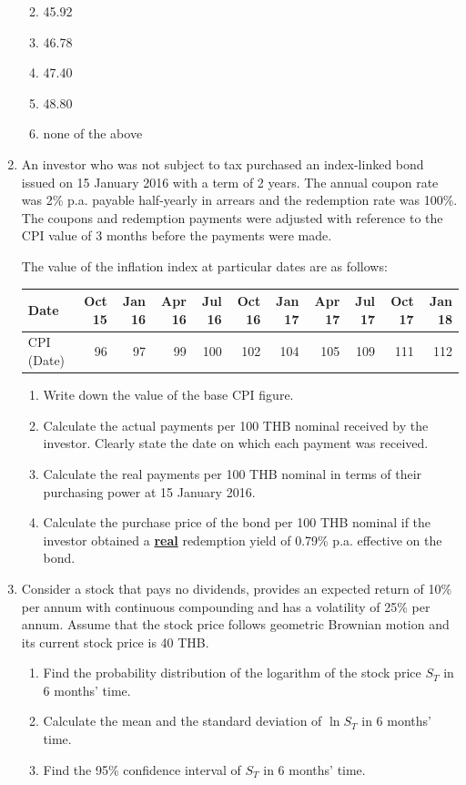 \documentclass[
]{book}
\theoremstyle{definition}
\theoremstyle{definition}
\theoremstyle{definition}
\theoremstyle{definition}
\theoremstyle{remark}
\begin{document}
\begin{enumerate}
  \begin{enumerate}
  \def\labelenumii{\Alph{enumii}.}
  \item
    45.92
  \item
    46.78
  \item
    47.40
  \item
    48.80
  \item
    none of the above
  \end{enumerate}
\item
  An investor who was not subject to tax purchased an index-linked
  bond issued on 15 January 2016 with a term of 2 years. The annual
  coupon rate was 2\% p.a. payable half-yearly in arrears and the
  redemption rate was 100\%. The coupons and redemption payments were
  adjusted with reference to the CPI value of 3 months before the
  payments were made.

  The value of the inflation index at particular dates are as follows:

  \begin{longtable}[]{@{}lrrrrrrrrrr@{}}
  \toprule\noalign{}
  Date & Oct 15 & Jan 16 & Apr 16 & Jul 16 & Oct 16 & Jan 17 & Apr 17 & Jul 17 & Oct 17 & Jan 18 \\
  \midrule\noalign{}
  \endhead
  \bottomrule\noalign{}
  \endlastfoot
  CPI (Date) & 96 & 97 & 99 & 100 & 102 & 104 & 105 & 109 & 111 & 112 \\
  \end{longtable}

  \begin{enumerate}
  \def\labelenumii{\arabic{enumii}.}
  \item
    Write down the value of the base CPI figure.
  \item
    Calculate the actual payments per 100 THB nominal received by
    the investor. Clearly state the date on which each payment was
    received.
  \item
    Calculate the real payments per 100 THB nominal in terms of
    their purchasing power at 15 January 2016.
  \item
    Calculate the purchase price of the bond per 100 THB nominal if
    the investor obtained a \ul{\textbf{real}} redemption yield of
    0.79\% p.a. effective on the bond.
  \end{enumerate}
\item
  Consider a stock that pays no dividends, provides an expected return
  of 10\% per annum with continuous compounding and has a volatility of
  25\% per annum. Assume that the stock price follows geometric
  Brownian motion and its current stock price is 40 THB.

  \begin{enumerate}
  \def\labelenumii{\arabic{enumii}.}
  \item
    Find the probability distribution of the logarithm of the stock
    price \(S_T\) in 6 months' time.
  \item
    Calculate the mean and the standard deviation of \(\ln S_T\) in 6
    months' time.
  \item
    Find the 95\% confidence interval of \(S_T\) in 6 months' time.
  \end{enumerate}
\end{enumerate}
\end{document}
